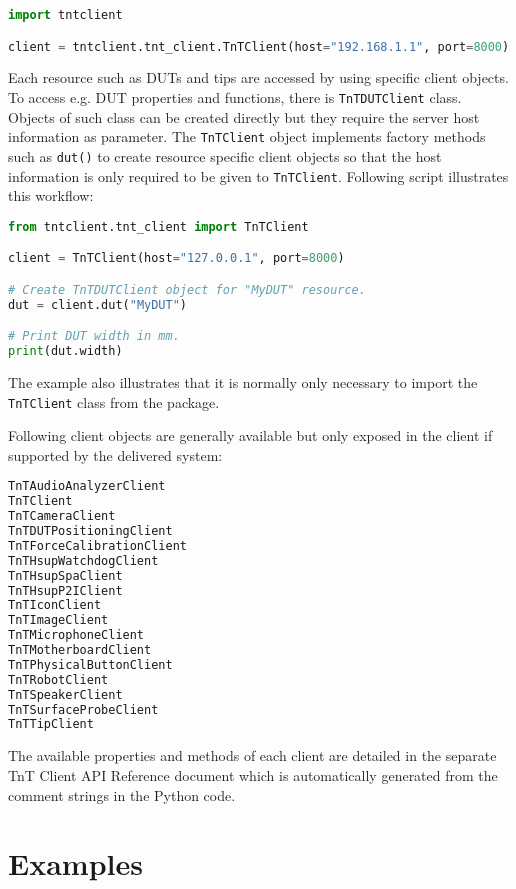 \begin{lstlisting}[language=Python]
import tntclient

client = tntclient.tnt_client.TnTClient(host="192.168.1.1", port=8000)
\end{lstlisting}

Each resource such as DUTs and tips are accessed by using specific client objects. To access e.g. DUT properties and functions, there is \texttt{TnTDUTClient} class. Objects of such class can be created directly but they require the server host information as parameter. The \texttt{TnTClient} object implements factory methods such as \texttt{dut()} to create resource specific client objects so that the host information is only required to be given to \texttt{TnTClient}. Following script illustrates this workflow:

\begin{lstlisting}[language=Python]
from tntclient.tnt_client import TnTClient

client = TnTClient(host="127.0.0.1", port=8000)

# Create TnTDUTClient object for "MyDUT" resource.
dut = client.dut("MyDUT")

# Print DUT width in mm.
print(dut.width)
\end{lstlisting}

The example also illustrates that it is normally only necessary to import the \texttt{TnTClient} class from the package.

Following client objects are generally available but only exposed in the client if supported by the delivered system:

\begin{lstlisting}[language=Python]
TnTAudioAnalyzerClient
TnTClient
TnTCameraClient
TnTDUTPositioningClient
TnTForceCalibrationClient
TnTHsupWatchdogClient
TnTHsupSpaClient
TnTHsupP2IClient
TnTIconClient
TnTImageClient
TnTMicrophoneClient
TnTMotherboardClient
TnTPhysicalButtonClient
TnTRobotClient
TnTSpeakerClient
TnTSurfaceProbeClient
TnTTipClient
\end{lstlisting}

The available properties and methods of each client are detailed in the separate TnT Client API Reference document which is automatically generated from the comment strings in the Python code.

\section{Examples}

